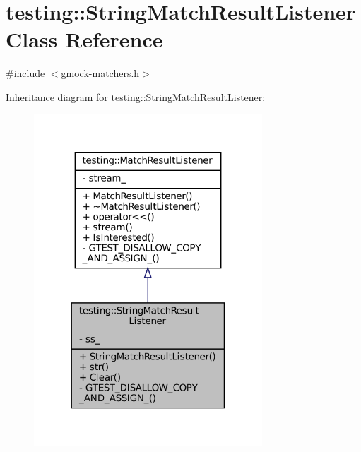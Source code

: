 \hypertarget{classtesting_1_1StringMatchResultListener}{}\section{testing\+:\+:String\+Match\+Result\+Listener Class Reference}
\label{classtesting_1_1StringMatchResultListener}


{\ttfamily \#include $<$gmock-\/matchers.\+h$>$}



Inheritance diagram for testing\+:\+:String\+Match\+Result\+Listener\+:
\nopagebreak
\begin{figure}[H]
\begin{center}
\leavevmode
\includegraphics[width=242pt]{classtesting_1_1StringMatchResultListener__inherit__graph}
\end{center}
\end{figure}



